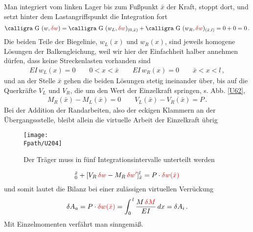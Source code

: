 {{{{Man integriert vom linken Lager bis zum Fu{\ss}punkt $\bar{x}$ der Kraft, stoppt dort, und setzt hinter dem Lastangriffspunkt die Integration fort
\begin{align}
\text{\normalfont\calligra G\,\,}(w, \textcolor{red}{\delta w}) = \text{\normalfont\calligra G\,\,}(w_L, \textcolor{red}{\delta w})_{(0,\bar{x})}+  \text{\normalfont\calligra G\,\,}(w_R, \textcolor{red}{\delta w})_{(\bar{x},l)} = 0 + 0 = 0\,.
\end{align}
Die beiden Teile der Biegelinie, $w_L(x)$ und $w_R(x)$, sind jeweils homogene L\"{o}sungen der Balkengleichung, weil wir hier der Einfachheit halber annehmen d\"{u}rfen, dass keine Streckenlasten vorhanden sind
\begin{align}
EI\,w_L(x) = 0 \qquad 0 < x < \bar{x} \qquad EI\,w_R(x) = 0 \qquad \bar{x}  < x < l\,,
\end{align}
und an der Stelle $\bar{x}$ gehen die beiden L\"{o}sungen stetig ineinander \"{u}ber, bis auf die Querkr\"{a}fte $V_L$ und $V_R$, die um den Wert der Einzelkraft springen, s. Abb. \ref{U62},
\begin{align}
M_R(\bar{x}) - M_L(\bar{x}) = 0 \qquad V_L(\bar{x})  - V_R(\bar{x})  = P\,.
\end{align}
Bei der Addition der Randarbeiten, also der eckigen Klammern an der \"{U}bergangssstelle, bleibt allein die virtuelle Arbeit der Einzelkraft \"{u}brig
\begin{figure}[tbp]
\centering
\if {} \sidecaption \fi
\texttt{[image: \\Fpath/U204]}
\caption{Der Tr\"{a}ger muss in f\"{u}nf Integrationsintervalle unterteilt werden} \label{U204}
\end{figure}%
\begin{align}
[V_L\,\textcolor{red}{\delta w} - M_L\,\textcolor{red}{\delta w'}]_0^{\bar{x}} + [V_R\,\textcolor{red}{\delta w} - M_R\,\textcolor{red}{\delta w'}]_{\bar{x}}^l = P\cdot\textcolor{red}{\delta w(\bar{x})}
\end{align}
und somit lautet die Bilanz bei einer zul\"{a}ssigen virtuellen Verr\"{u}ckung
\begin{align}
\delta A_a = P\cdot\textcolor{red}{\delta w(\bar{x})} = \int_0^{\,l} \frac{M\,\textcolor{red}{\delta M}}{EI}\,dx = \delta A_i\,.
\end{align}
Mit Einzelmomenten verf\"{a}hrt man sinngem\"{a}{\ss}.

}}}}
